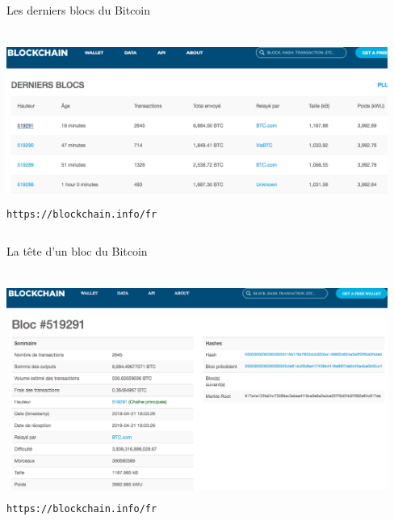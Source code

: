 

\begin{frame}{\LARGE Les derniers blocs du Bitcoin}

\begin{columns}
\column{\dimexpr\paperwidth-1pt}

\begin{center}
\vskip -0.3cm
\includegraphics[width=12.5cm,height=5.25cm]{graphics/blockchain-info-2018-04-21-14-21-25.png}
\vskip 0.2cm
{\scriptsize\texttt{https://blockchain.info/fr}}
\end{center}

\end{columns}

\normalsize
\end{frame}


\begin{frame}{\vskip -0.3cm\large La t\^ete d'un bloc du Bitcoin}

\begin{columns}
\column{\dimexpr\paperwidth-1pt}

\begin{center}
\vskip -0.3cm
\includegraphics[width=12.5cm,height=7.0cm]{graphics/Bloc-bitcoin-519291-top.png}
\vskip -0.2cm
{\tiny\texttt{https://blockchain.info/fr}}
\end{center}

\end{columns}

\normalsize
\end{frame}

